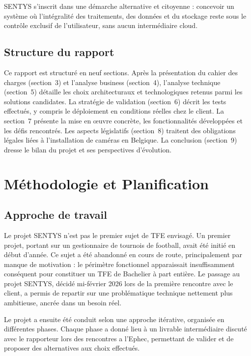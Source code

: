 \documentclass[12pt,a4paper]{article}
\begin{document}
SENTYS s'inscrit dans une démarche alternative et citoyenne : concevoir un système où l'intégralité des traitements, des données et du stockage reste sous le contrôle exclusif de l'utilisateur, sans aucun intermédiaire cloud.

\subsection{Structure du rapport}

Ce rapport est structuré en neuf sections. Après la présentation du cahier des charges (section~3) et l'analyse business (section~4), l'analyse technique (section~5) détaille les choix architecturaux et technologiques retenus parmi les solutions candidates. La stratégie de validation (section~6) décrit les tests effectués, y compris le déploiement en conditions réelles chez le client. La section~7 présente la mise en œuvre concrète, les fonctionnalités développées et les défis rencontrés. Les aspects législatifs (section~8) traitent des obligations légales liées à l'installation de caméras en Belgique. La conclusion (section~9) dresse le bilan du projet et ses perspectives d'évolution.

\section{Méthodologie et Planification}

\subsection{Approche de travail}

Le projet SENTYS n'est pas le premier sujet de TFE envisagé. Un premier projet, portant sur un gestionnaire de tournois de football, avait été initié en début d'année. Ce sujet a été abandonné en cours de route, principalement par manque de motivation : le périmètre fonctionnel apparaissait insuffisamment conséquent pour constituer un TFE de Bachelier à part entière. Le passage au projet SENTYS, décidé mi-février 2026 lors de la première rencontre avec le client, a permis de repartir sur une problématique technique nettement plus ambitieuse, ancrée dans un besoin réel.

Le projet a ensuite été conduit selon une approche itérative, organisée en différentes phases. Chaque phase a donné lieu à un livrable intermédiaire discuté avec le rapporteur lors des rencontres a l'Ephec, permettant de valider et de proposer des alternatives aux choix effectués.
\end{document}
